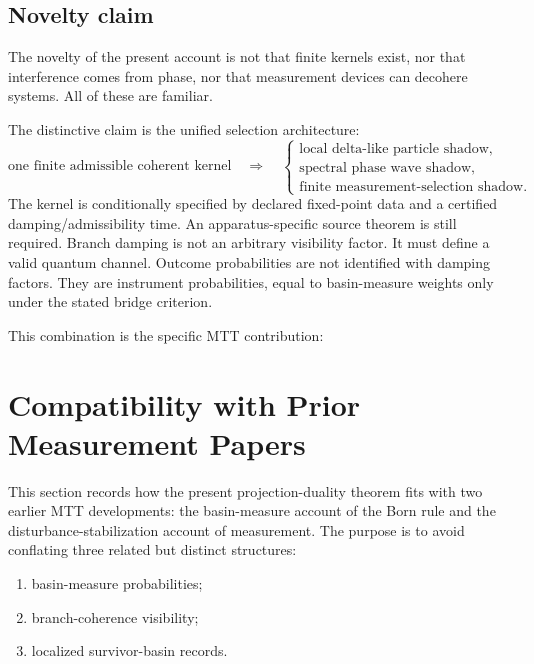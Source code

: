 \documentclass[11pt]{article}
\begin{document}
\subsection{Novelty claim}
\label{subsec:novelty-claim}

The novelty of the present account is not that finite kernels exist, nor that interference comes
from phase, nor that measurement devices can decohere systems. All of these are familiar.

The distinctive claim is the unified selection architecture:
\begin{equation}
  \boxed{
  \text{one finite admissible coherent kernel}
  \quad\Longrightarrow\quad
  \begin{cases}
  \text{local delta-like particle shadow},\\
  \text{spectral phase wave shadow},\\
  \text{finite measurement-selection shadow}.
  \end{cases}
  }
\end{equation}
The kernel is conditionally specified by declared fixed-point data and a certified
damping/admissibility time. An apparatus-specific source theorem is still required. Branch damping is not an arbitrary
visibility factor. It must define a valid quantum channel. Outcome probabilities are not
identified with damping factors. They are instrument probabilities, equal to basin-measure
weights only under the stated bridge criterion.

This combination is the specific MTT contribution:
\begin{center}
\end{center}





\section{Compatibility with Prior Measurement Papers}
\label{sec:compatibility-prior-papers}

This section records how the present projection-duality theorem fits with two earlier MTT
developments: the basin-measure account of the Born rule and the disturbance-stabilization
account of measurement. The purpose is to avoid conflating three related but distinct
structures:
\begin{enumerate}[label=(\roman*)]
  \item basin-measure probabilities;
  \item branch-coherence visibility;
  \item localized survivor-basin records.
\end{enumerate}
\end{document}
